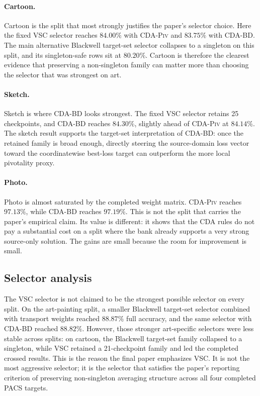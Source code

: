 \documentclass{article}
\theoremstyle{definition}
\newcommand{\piv}{\textup{\textsc{CDA-Piv}}}
\newcommand{\bd}{\textup{\textsc{CDA-BD}}}
\begin{document}
\paragraph{Cartoon.}
Cartoon is the split that most strongly justifies the paper's selector choice. Here the fixed VSC selector reaches \(84.00\%\) with \piv{} and \(83.75\%\) with \bd{}. The main alternative Blackwell target-set selector collapses to a singleton on this split, and its singleton-safe rows sit at \(80.20\%\). Cartoon is therefore the clearest evidence that preserving a non-singleton family can matter more than choosing the selector that was strongest on art.

\paragraph{Sketch.}
Sketch is where \bd{} looks strongest. The fixed VSC selector retains 25 checkpoints, and \bd{} reaches \(84.30\%\), slightly ahead of \piv{} at \(84.14\%\). The sketch result supports the target-set interpretation of \bd{}: once the retained family is broad enough, directly steering the source-domain loss vector toward the coordinatewise best-loss target can outperform the more local pivotality proxy.

\paragraph{Photo.}
Photo is almost saturated by the completed weight matrix. \piv{} reaches \(97.13\%\), while \bd{} reaches \(97.19\%\). This is not the split that carries the paper's empirical claim. Its value is different: it shows that the CDA rules do not pay a substantial cost on a split where the bank already supports a very strong source-only solution. The gains are small because the room for improvement is small.

\subsection{Selector analysis}

The VSC selector is not claimed to be the strongest possible selector on every split. On the art-painting split, a smaller Blackwell target-set selector combined with transport weights reached \(88.87\%\) full accuracy, and the same selector with \bd{} reached \(88.82\%\). However, those stronger art-specific selectors were less stable across splits: on cartoon, the Blackwell target-set family collapsed to a singleton, while VSC retained a 21-checkpoint family and led the completed crossed results. This is the reason the final paper emphasizes VSC. It is not the most aggressive selector; it is the selector that satisfies the paper's reporting criterion of preserving non-singleton averaging structure across all four completed PACS targets.
\end{document}
